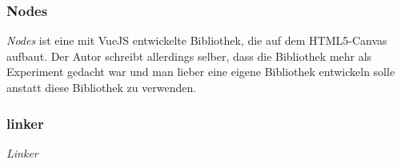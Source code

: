\subsubsection*{Nodes}
\textit{Nodes} ist eine mit VueJS entwickelte Bibliothek, die auf dem HTML5-Canvas aufbaut. Der Autor schreibt allerdings selber, dass die Bibliothek mehr als Experiment gedacht war und man lieber eine eigene Bibliothek entwickeln solle anstatt diese Bibliothek zu verwenden.

\subsubsection*{linker}
\textit{Linker} 